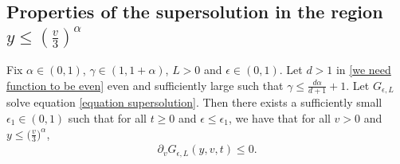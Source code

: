 \documentclass[11pt]{article}
\numberwithin{equation}{section}
\begin{document}
  \subsection{Properties of the supersolution in the region $y\leq (\frac{v}{3})^{\alpha} $}
 \begin{prop}\label{der v g negative}
Fix $\alpha\in(0,1)$, $\gamma\in(1,1+\alpha)$, $L>0$ and $\epsilon\in(0,1)$. Let $d>1$ in \eqref{we need function to be even} even and sufficiently large such that $\gamma\leq \frac{d\alpha}{d+1}+1$. Let $G_{\epsilon,L}$ solve equation \eqref{equation supersolution}. Then there exists a sufficiently small $\epsilon_{1}\in(0,1)$ such that for all $t \geq 0$ and $\epsilon\leq \epsilon_{1}$, we have that for all $v>0$ and $y\leq \big(\frac{v}{3}\big)^{\alpha}$,
\begin{align*}
    \partial_{v}G_{\epsilon,L}(y,v,t)\leq 0.
\end{align*}
 \end{prop}
\end{document}
